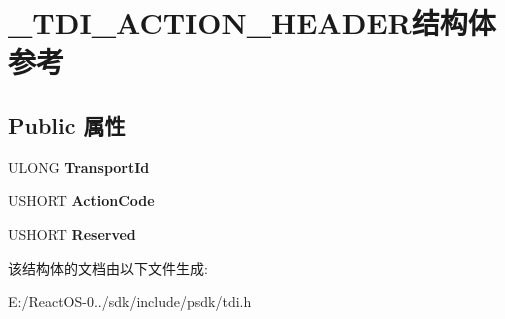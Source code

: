 \hypertarget{struct___t_d_i___a_c_t_i_o_n___h_e_a_d_e_r}{}\section{\+\_\+\+T\+D\+I\+\_\+\+A\+C\+T\+I\+O\+N\+\_\+\+H\+E\+A\+D\+E\+R结构体 参考}
\label{struct___t_d_i___a_c_t_i_o_n___h_e_a_d_e_r}
\subsection*{Public 属性}
\begin{DoxyCompactItemize}
\item 
\mbox{\label{struct___t_d_i___a_c_t_i_o_n___h_e_a_d_e_r_ac3f4edc64413849f0ba866c1d940d0ea}} 
U\+L\+O\+NG {\bfseries Transport\+Id}
\item 
\mbox{\label{struct___t_d_i___a_c_t_i_o_n___h_e_a_d_e_r_af44af0cb3ef856e16cf7c3a01e06603a}} 
U\+S\+H\+O\+RT {\bfseries Action\+Code}
\item 
\mbox{\label{struct___t_d_i___a_c_t_i_o_n___h_e_a_d_e_r_ae71cb77a1281a41c32e77b37cc460541}} 
U\+S\+H\+O\+RT {\bfseries Reserved}
\end{DoxyCompactItemize}


该结构体的文档由以下文件生成\+:\begin{DoxyCompactItemize}
\item 
E\+:/\+React\+O\+S-\/0../sdk/include/psdk/tdi.\+h\end{DoxyCompactItemize}
